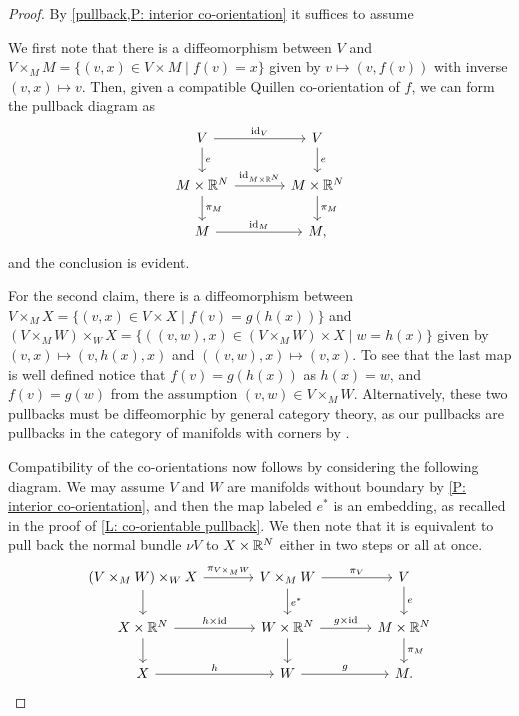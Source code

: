\begin{proof}
	By \cref{pullback,P: interior co-orientation} it suffices to assume

	We first note that there is a diffeomorphism between $V$ and $V \times_M M = \{(v,x) \in V \times M \mid f(v) = x\}$ given by $v \mapsto (v,f(v))$ with inverse $(v,x) \mapsto v$.
	Then, given a compatible Quillen co-orientation of $f$, we can form the pullback diagram as
	\[
	\begin{tikzcd}[column sep=large]
		V \arrow[r, "\id_V"] \arrow[d,"e"] & V \arrow[d,"e"] \\
		M \times \R^N \arrow[r, "\id_{M \times \R^N}"] \arrow[d,"\pi_M"] & M \times \R^N \arrow[d,"\pi_M"] \\
		M \arrow[r, "\id_M"] & M,
	\end{tikzcd}
	\]
	and the conclusion is evident.

	For the second claim, there is a diffeomorphism between $V \times_M X = \{(v,x) \in V \times X \mid f(v) = g(h(x))\}$ and $(V \times_M W) \times_W X = \{((v,w),x) \in (V \times_M W) \times X \mid w = h(x)\}$ given by $(v,x) \mapsto (v,h(x),x)$ and $((v,w),x) \mapsto (v,x)$.
	To see that the last map is well defined notice that $f(v) = g(h(x))$ as $h(x) = w$, and $f(v) = g(w)$ from the assumption $(v,w) \in V \times_M W$.
	Alternatively, these two pullbacks must be diffeomorphic by general category theory, as our pullbacks are pullbacks in the category of manifolds with corners by \cite[Section 6]{Joy12}.

	Compatibility of the co-orientations now follows by considering the following diagram.
	We may assume $V$ and $W$ are manifolds without boundary by \cref{P: interior co-orientation}, and then the map labeled $e^*$ is an embedding, as recalled in the proof of \cref{L: co-orientable pullback}.
	We then note that it is equivalent to pull back the normal bundle $\nu V$ to $X \times \mathbb{R}^N$ either in two steps or all at once.
	\[
	\begin{tikzcd}[column sep=large]
		(V \times_M W) \times_W X \arrow[r, "\pi_{V \times_M W}"] \arrow[d] & V \times_M W \arrow[r, "\pi_V"] \arrow[d,"e^*"] & V \arrow[d, "e"] \\
		X \times \R^N \arrow[r, "h \times \id"] \arrow[d] & W \times \R^N \arrow[r, "g \times \id"] \arrow[d] & M \times \R^N \arrow[d, "\pi_M"] \\
		X \arrow[r, "h"] & W \arrow[r, "g"] & M.
	\end{tikzcd}
	\]
\end{proof}

